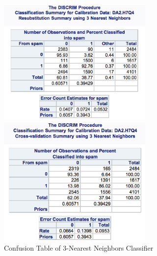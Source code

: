 \documentclass[letterpaper, 12pt]{article}
\begin{document}
\begin{figure}[htbp]
\begin{minipage}[t]{0.5\linewidth}
\centering
\includegraphics[width=3in]{7-17.eps}
\end{minipage}
\begin{minipage}[t]{0.5\linewidth}
\centering
\includegraphics[width=3in]{7-18.eps}
\end{minipage}
\caption{Confusion Table of 3-Nearest Neighbors Classifier}\label{t2}
\end{figure}
\end{document}
